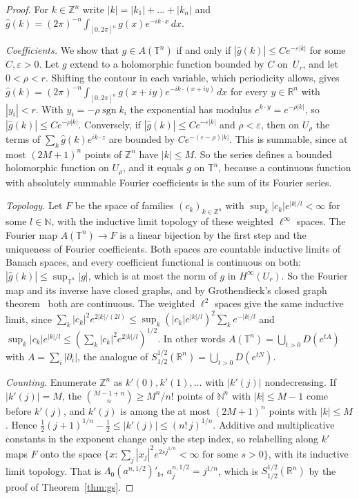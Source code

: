 \documentclass[11pt]{article}
\theoremstyle{definition}
\begin{document}
\begin{proof}
  For $k \in \mathbb Z^n$ write $|k| = |k_1| + \dots + |k_n|$ and
  $\hat g(k) = (2\pi)^{-n}\int_{[0,2\pi]^n} g(x)e^{-ik\cdot x}\,dx$.

  \emph{Coefficients.} We show that $g \in A(\mathbb T^n)$ if and only if
  $|\hat g(k)| \le Ce^{-\varepsilon|k|}$ for some $C, \varepsilon > 0$. Let $g$ extend to a
  holomorphic function bounded by $C$ on~$U_r$, and let $0 < \rho < r$. Shifting the contour in
  each variable, which periodicity allows, gives
  $\hat g(k) = (2\pi)^{-n}\int_{[0,2\pi]^n} g(x+iy)e^{-ik\cdot(x+iy)}\,dx$ for every
  $y \in \mathbb R^n$ with $|y_i| < r$. With $y_i = -\rho\operatorname{sgn}k_i$ the exponential has
  modulus $e^{k\cdot y} = e^{-\rho|k|}$, so $|\hat g(k)| \le Ce^{-\rho|k|}$. Conversely, if
  $|\hat g(k)| \le Ce^{-\varepsilon|k|}$ and $\rho < \varepsilon$, then on $U_\rho$ the terms of
  $\sum_k \hat g(k)e^{ik\cdot z}$ are bounded by $Ce^{-(\varepsilon-\rho)|k|}$. This is summable,
  since at most $(2M+1)^n$ points of $\mathbb Z^n$ have $|k| \le M$. So the series defines a
  bounded holomorphic function on $U_\rho$, and it equals $g$ on $\mathbb T^n$, because a
  continuous function with absolutely summable Fourier coefficients is the sum of its Fourier
  series.

  \emph{Topology.} Let $F$ be the space of families $(c_k)_{k \in \mathbb Z^n}$ with
  $\sup_k |c_k|e^{|k|/l} < \infty$ for some $l \in \mathbb N$, with the inductive limit topology
  of these weighted $\ell^\infty$ spaces. The Fourier map $A(\mathbb T^n) \to F$ is a linear
  bijection by the first step and the uniqueness of Fourier coefficients. Both spaces are
  countable inductive limits of Banach spaces, and every coefficient functional is continuous on
  both: $|\hat g(k)| \le \sup_{\mathbb T^n}|g|$, which is at most the norm of $g$ in
  $H^\infty(U_r)$. So the Fourier map and its inverse have closed graphs, and by Grothendieck's
  closed graph theorem~\cite{mv} both are continuous. The weighted $\ell^2$ spaces give the same
  inductive limit, since
  $\sum_k |c_k|^2e^{2|k|/(2l)} \le \sup_k(|c_k|e^{|k|/l})^2\sum_k e^{-|k|/l}$ and
  $\sup_k |c_k|e^{|k|/l} \le (\sum_k |c_k|^2e^{2|k|/l})^{1/2}$. In other words
  $A(\mathbb T^n) = \bigcup_{t > 0} D(e^{tA})$ with $A = \sum_i |\partial_i|$, the analogue of
  $S^{1/2}_{1/2}(\mathbb R^n) = \bigcup_{t > 0} D(e^{tN})$.

  \emph{Counting.} Enumerate $\mathbb Z^n$ as $k'(0), k'(1), \dots$ with $|k'(j)|$ nondecreasing.
  If $|k'(j)| = M$, the $\binom{M-1+n}{n} \ge M^n/n!$ points of $\mathbb N^n$ with $|k| \le M-1$
  come before $k'(j)$, and $k'(j)$ is among the at most $(2M+1)^n$ points with $|k| \le M$. Hence
  $\frac12(j+1)^{1/n} - \frac12 \le |k'(j)| \le (n!\,j)^{1/n}$. Additive and multiplicative
  constants in the exponent change only the step index, so relabelling along $k'$ maps $F$ onto
  the space $\{x : \sum_j |x_j|^2e^{2sj^{1/n}} < \infty \text{ for some } s > 0\}$, with its
  inductive limit topology. That is $\Lambda_0(a^{n,1/2})'_b$, $a^{n,1/2}_j = j^{1/n}$, which is
  $S^{1/2}_{1/2}(\mathbb R^n)$ by the proof of Theorem~\ref{thm:gs}.


\end{proof}
\end{document}
